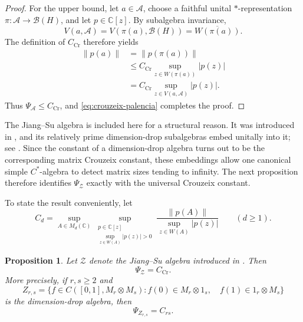 \documentclass[a4paper]{amsart}
\newtheorem{proposition}[theorem]{Proposition}
\theoremstyle{remark}
\newcommand{\C}{\mathbb C}
\newcommand{\calA}{\mathcal A}
\newcommand{\calB}{\mathcal B}
\begin{document}
\begin{proof}
For the upper bound, let \(a\in\calA\), choose a faithful unital
\(*\)-representation \(\pi:\calA\to\calB(H)\), and let \(p\in\C[z]\).  By
subalgebra invariance,
\[
       V(a,\calA)=V(\pi(a),\calB(H))=\overline{W(\pi(a))}.
\]
The definition of \(C_{\mathrm{Cr}}\) therefore yields
\[
\begin{split}
       \|p(a)\|
       &=\|p(\pi(a))\|\\
       &\leqslant C_{\mathrm{Cr}}
          \sup_{z\in W(\pi(a))}|p(z)|\\
       &=C_{\mathrm{Cr}}
          \sup_{z\in V(a,\calA)}|p(z)|.
\end{split}
\]
Thus \(\Psi_{\calA}\leqslant C_{\mathrm{Cr}}\), and
\eqref{eq:crouzeix-palencia} completes the proof.
\end{proof}


The Jiang--Su algebra is included here for a structural reason.  It was
introduced in \cite{JiangSu}, and its relatively prime dimension-drop
subalgebras embed unitally into it; see
\cite[Theorem~2.2 and Proposition~3.3]{RordamWinter}.  Since the constant of
a dimension-drop algebra turns out to be the corresponding matrix Crouzeix
constant, these embeddings allow one canonical simple \(C^*\)-algebra to
detect matrix sizes tending to infinity.  The next proposition therefore
identifies \(\Psi_{\mathcal Z}\) exactly with the universal Crouzeix constant.

To state the result conveniently, let
\[
       C_d=
       \sup_{A\in M_d(\C)}
       \sup_{\substack{p\in\C[z]\\
               \sup_{z\in W(A)}|p(z)|>0}}
       \frac{\|p(A)\|}{\sup_{z\in W(A)}|p(z)|}
       \qquad(d\geqslant1).
\]

\begin{proposition}\label{prop:jiang-su}
Let \(\mathcal Z\) denote the Jiang--Su algebra introduced in
\cite{JiangSu}.  Then
\[
       \Psi_{\mathcal Z}=C_{\mathrm{Cr}}.
\]
More precisely, if \(r,s\geqslant2\) and
\[
 Z_{r,s}=\bigl\{f\in C([0,1],M_r\otimes M_s):
 f(0)\in M_r\otimes1_s,\quad f(1)\in1_r\otimes M_s\bigr\}
\]
is the dimension-drop algebra, then
\[
       \Psi_{Z_{r,s}}=C_{rs}.
\]
\end{proposition}
\end{document}
